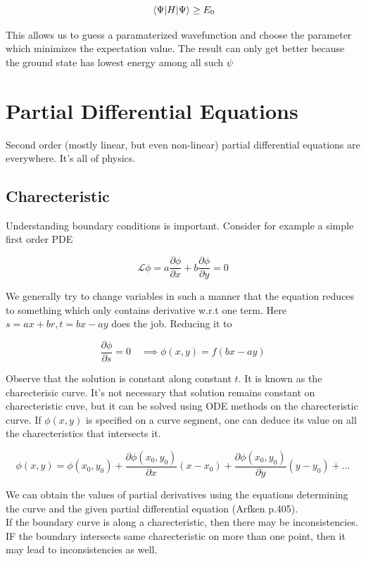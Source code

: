 \documentclass{report}
\begin{document}
$$\expval{H}{\Psi} \ge E_0$$

\noindent This allows us to guess a paramaterized wavefunction and choose the parameter which minimizes the expectation value. The result can only get better because the ground state has lowest energy among all such $\psi$


\section{Partial Differential Equations}
Second order (mostly linear, but even non-linear) partial differential equations are everywhere. It's all of physics. 

\subsection{Charecteristic}
Understanding boundary conditions is important. Consider for example a simple first order PDE

$$\mathcal{L}\phi = a\frac{\partial\phi}{\partial x} + b\frac{\partial\phi}{\partial y} = 0$$

\noindent We generally try to change variables in such a manner that the equation reduces to something which only contains derivative w.r.t one term. Here $s = ax+br, t= bx-ay$ does the job. Reducing it to 

$$\frac{\partial\phi}{\partial s} = 0 \quad\implies \phi(x,y) = f(bx-ay)$$

\noindent Observe that the solution is constant along constant $t$. It is known as the charecterisic curve. It's not necessary that solution remains constant on charecteristic cuve, but it can be solved using ODE methods on the charecteristic curve. If $\phi(x,y)$ is specified on a curve segment, one can deduce its value on all the charecteristics that intersects it.

$$\phi(x,y) = \phi(x_0,y_0) + \frac{\partial \phi(x_0,y_0)}{\partial x}(x-x_0) + \frac{\partial\phi(x_0,y_0)}{\partial y}(y-y_0) + ...$$

\noindent We can obtain the values of partial derivatives using the equations determining the curve and the given partial differential equation (Arfken p.405).\\

\noindent If the boundary curve is along a charecteristic, then there may be inconsistencies. IF the boundary intersects same charecteristic on more than one point, then it may lead to inconsistencies as well.\\
\end{document}
